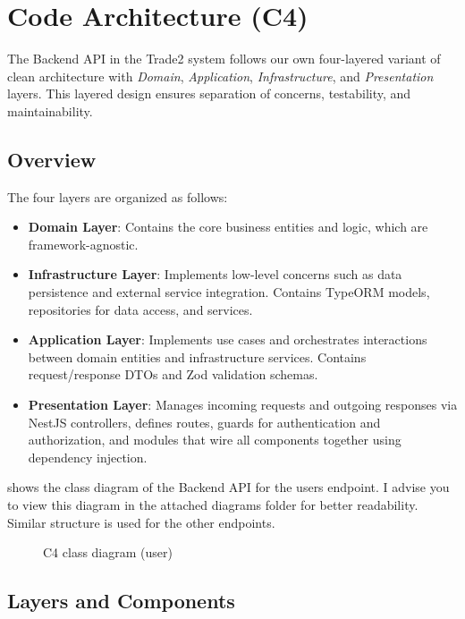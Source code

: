 \section{Code Architecture (C4)}
The Backend API in the Trade2 system follows our own four-layered variant of clean architecture with \emph{Domain}, \emph{Application}, \emph{Infrastructure}, and \emph{Presentation} layers.
This layered design ensures separation of concerns, testability, and maintainability.

\subsection{Overview}
The four layers are organized as follows:

\begin{itemize}
    \item \textbf{Domain Layer}: Contains the core business entities and logic, which are framework-agnostic.
    \item \textbf{Infrastructure Layer}: Implements low-level concerns such as data persistence and external service integration.
    Contains TypeORM models, repositories for data access, and services.
    \item \textbf{Application Layer}: Implements use cases and orchestrates interactions between domain entities and infrastructure services.
    Contains request/response DTOs and Zod validation schemas.
    \item \textbf{Presentation Layer}: Manages incoming requests and outgoing responses via NestJS controllers, defines routes, guards for authentication and authorization, and modules that wire all components together using dependency injection.
\end{itemize}

 shows the class diagram of the Backend API for the users endpoint.
I advise you to view this diagram in the attached diagrams folder for better readability.
Similar structure is used for the other endpoints.

\begin{figure}[H]
    \caption{C4 class diagram (user)}
    \label{fig:c4}
\end{figure}

\subsection{Layers and Components}

